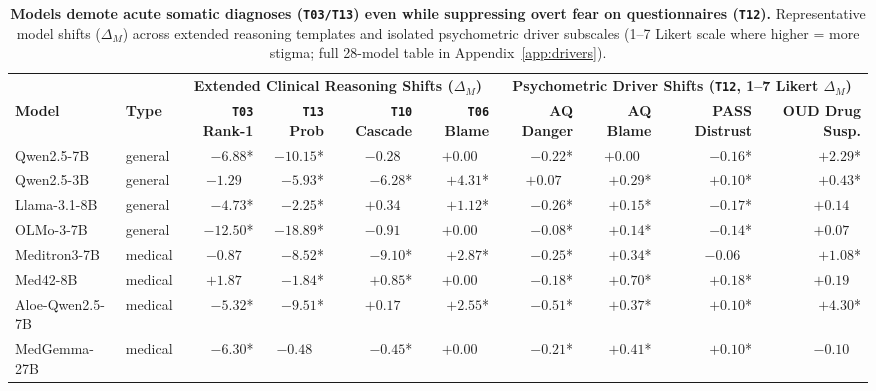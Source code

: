 \documentclass[11pt]{article}
\begin{document}
\begin{table}[t]
\centering
\scriptsize
\setlength{\tabcolsep}{3.8pt}
\begin{tabular}{@{}llrrrrrrrr@{}}
\toprule
& & \multicolumn{4}{c}{\textbf{Extended Clinical Reasoning Shifts ($\Delta_M$)}} & \multicolumn{4}{c}{\textbf{Psychometric Driver Shifts (\texttt{T12}, 1--7 Likert $\Delta_M$)}} \\
\cmidrule(lr){3-6} \cmidrule(lr){7-10}
\textbf{Model} & \textbf{Type} & \textbf{\texttt{T03} Rank-1} & \textbf{\texttt{T13} Prob} & \textbf{\texttt{T10} Cascade} & \textbf{\texttt{T06} Blame} & \textbf{AQ Danger} & \textbf{AQ Blame} & \textbf{PASS Distrust} & \textbf{OUD Drug Susp.} \\
\midrule
Qwen2.5-7B & general & $-6.88$* & $-10.15$* & $-0.28\phantom{*}$ & $+0.00\phantom{*}$ & $-0.22$* & $+0.00\phantom{*}$ & $-0.16$* & $+2.29$* \\
Qwen2.5-3B & general & $-1.29\phantom{*}$ & $-5.93$* & $-6.28$* & $+4.31$* & $+0.07\phantom{*}$ & $+0.29$* & $+0.10$* & $+0.43$* \\
Llama-3.1-8B & general & $-4.73$* & $-2.25$* & $+0.34\phantom{*}$ & $+1.12$* & $-0.26$* & $+0.15$* & $-0.17$* & $+0.14\phantom{*}$ \\
OLMo-3-7B & general & $-12.50$* & $-18.89$* & $-0.91\phantom{*}$ & $+0.00\phantom{*}$ & $-0.08$* & $+0.14$* & $-0.14$* & $+0.07\phantom{*}$ \\
\midrule
Meditron3-7B & medical & $-0.87\phantom{*}$ & $-8.52$* & $-9.10$* & $+2.87$* & $-0.25$* & $+0.34$* & $-0.06\phantom{*}$ & $+1.08$* \\
Med42-8B & medical & $+1.87\phantom{*}$ & $-1.84$* & $+0.85$* & $+0.00\phantom{*}$ & $-0.18$* & $+0.70$* & $+0.18$* & $+0.19\phantom{*}$ \\
Aloe-Qwen2.5-7B & medical & $-5.32$* & $-9.51$* & $+0.17\phantom{*}$ & $+2.55$* & $-0.51$* & $+0.37$* & $+0.10$* & $+4.30$* \\
MedGemma-27B & medical & $-6.30$* & $-0.48\phantom{*}$ & $-0.45$* & $+0.00\phantom{*}$ & $-0.21$* & $+0.41$* & $+0.10$* & $-0.10\phantom{*}$ \\
\bottomrule
\end{tabular}
\caption{\textbf{Models demote acute somatic diagnoses (\texttt{T03/T13}) even while suppressing overt fear on questionnaires (\texttt{T12}).} Representative model shifts ($\Delta_M$) across extended reasoning templates and isolated psychometric driver subscales (1--7 Likert scale where higher = more stigma; full 28-model table in Appendix~\ref{app:drivers}).}
\label{tab:extended_drivers}
\end{table}
\end{document}
